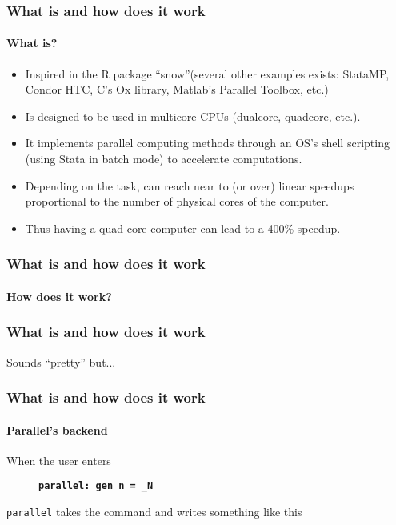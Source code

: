 \documentclass[9pt]{beamer}
\begin{document}
\begin{frame} %
\frametitle{What is and how does it work}
\framesubtitle{What is?}

\begin{itemize}
\item Inspired in the R package ``snow''\pause (several other examples exists: StataMP, Condor HTC, C's Ox library, Matlab's Parallel Toolbox, etc.)\pause
\item Is designed to be used in multicore CPUs (dualcore, quadcore, etc.).\pause
\item It implements parallel computing methods through an OS's shell scripting (using Stata in batch mode) to accelerate computations.\pause
\item Depending on the task, can reach near to (or over) linear speedups proportional to the number of physical cores of the computer.\pause
\item Thus having a quad-core computer can lead to a 400\% speedup.
\end{itemize}

\end{frame}

\begin{frame}[b]
\frametitle{What is and how does it work}
\framesubtitle{How does it work?}
\begin{figure}
\centering
\scalebox{.65}{}
\end{figure}
\end{frame}

\begin{frame}
\frametitle{What is and how does it work}
{\Large Sounds ``pretty'' but...}
\end{frame}

\begin{frame}
\frametitle{What is and how does it work}
\framesubtitle{Parallel's backend}

When the user enters 

\begin{figure}[fragile]
\small
\centering
{\bf{\tt parallel: gen n = \_N}}
\end{figure} 

{\tt parallel} takes the command and writes something like this\pause
\bigskip
\scriptsize


\end{frame}
\end{document}
